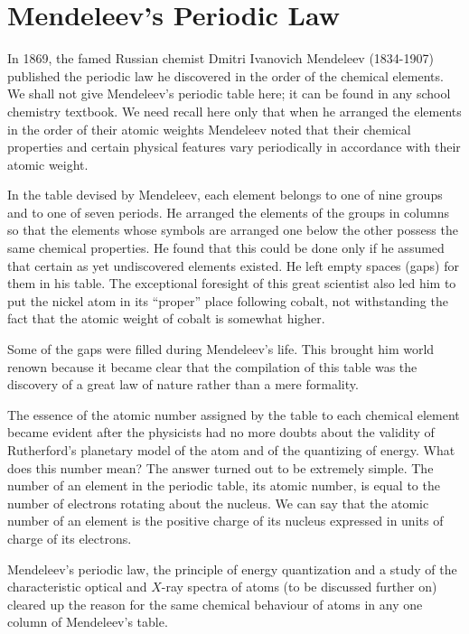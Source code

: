 \section{Mendeleev's Periodic Law}

In 1869, the famed Russian chemist Dmitri Ivanovich Mendeleev (1834-1907) published the periodic law he discovered in the order of the chemical elements. We shall not give Mendeleev's periodic table here; it can be found in any school chemistry textbook. We need recall here only that when he arranged the elements in the order of their atomic weights Mendeleev noted that their chemical properties and certain physical features vary periodically in accordance with their atomic weight. 

In the table devised by Mendeleev, each element belongs to one of nine groups and to one of seven periods. He arranged the elements of the groups in columns so that the elements whose symbols are arranged one below the other possess the same chemical properties. He found that this could be done only if he assumed that certain as yet undiscovered elements existed. He left empty spaces (gaps) for them in his table. The exceptional foresight of this great scientist also led him to put the nickel atom in its ``proper'' place following cobalt, not withstanding the fact that the atomic weight of cobalt is somewhat higher.

Some of the gaps were filled during Mendeleev's life. This brought him world renown because it became clear that the compilation of this table was the discovery of a great law of nature rather than a mere formality.

The essence of the atomic number assigned by the table to each chemical element became evident after the physicists had no more doubts about the validity of Rutherford's planetary model of the atom and of the quantizing of energy. What does this number mean? The answer turned out to be extremely simple. The number of an element in the periodic table, its atomic number, is equal to the number of electrons rotating about the nucleus. We can say that the atomic number of an element is the positive charge of its nucleus expressed in units of charge of its electrons.

Mendeleev's periodic law, the principle of energy quantization and a study of the characteristic optical and $X$-ray spectra of atoms (to be discussed further on) cleared up the reason for the same chemical behaviour of atoms in any one column of Mendeleev's table.

